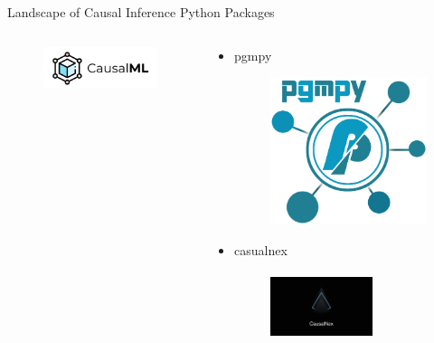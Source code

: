 \documentclass{beamer}
\begin{document}
\begin{frame}{Landscape of Causal Inference Python Packages}
\begin{columns}
\begin{column}[T]{0.55 \textwidth}
\begin{itemize}
					\begin{figure}
						\includegraphics[scale=0.3]{imgs/causalml.png}
					\end{figure}
			\end{itemize}

		\end{column}
		\vrule
		\begin{column}[T]{0.45 \textwidth}
			\begin{itemize}
				\item pgmpy
					\begin{figure}
						\includegraphics[scale=0.2]{imgs/pgmpy.png}
					\end{figure}
				\item casualnex
					\begin{figure}
						\includegraphics[height=2cm, width=3cm, scale=0.2]{imgs/causalnex.png}
					\end{figure}
			\end{itemize}
		\end{column}
	\end{columns}
\end{frame}
\end{document}
